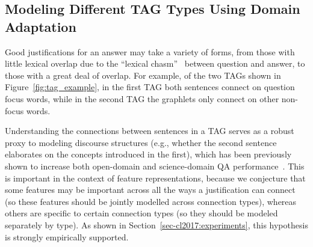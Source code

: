 \subsection {Modeling Different TAG Types Using Domain Adaptation} %
\label{sec-cl2017:characterizing}

Good justifications for an answer may take a variety of forms, from those with little lexical overlap due to the ``lexical chasm''~\citep{Berger:00} between question and answer, to those with a great deal of overlap. For example, of the two TAGs shown in Figure~\ref{fig:tag_example}, in the first TAG both sentences connect on question focus words, while in the second TAG the graphlets only connect on other non-focus words. 

Understanding the connections between sentences in a TAG serves as a robust proxy to modeling discourse structures (e.g., whether the second sentence elaborates on the concepts introduced in the first), which has been previously shown to increase both open-domain and science-domain QA performance~\citep{jansen14}.
This is important in the context of feature representations, because we conjecture that some features may be important across all the ways a justification can connect (so these features should be jointly modelled across connection types), whereas others are specific to certain connection types (so they should be modeled separately by type). As shown in Section~\ref{sec-cl2017:experiments}, this hypothesis is strongly empirically supported.

